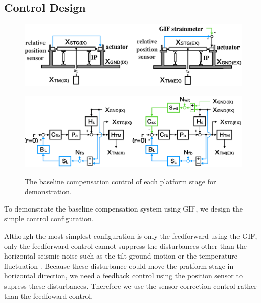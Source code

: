 \subsection{Control Design}
\begin{figure}[h]
  \begin{minipage}{14cm}
    \begin{center}   
      \includegraphics[width=14cm]{./img_chap6/img630a.png}
      \label{img:img630a} \hfill\vspace{10pt}
    \end{center}
  \end{minipage}
  \begin{minipage}{14cm}
    \begin{center}   
      \includegraphics[width=14cm]{./img_chap6/img630b.png}
      \label{img:img630b}
    \end{center}
  \end{minipage}
  \caption{The baseline compensation control of each platform stage for demonstration.}
\end{figure}

To demonstrate the baseline compensation system using GIF, we design the simple control configuration.

Although the most simplest configuration is only the feedforward using the GIF, only the feedforward control cannot suppress the disturbances other than the horizontal seismic noise such as the tilt ground motion or the temperature fluctuation \cite{sekiguchi2016astudy}. Because these disturbance could move the pratform stage in horizontal direction, we need a feedback control using the position sensor to supress these disturbances. Therefore we use the sensor correction control rather than the feedfoward control. 

